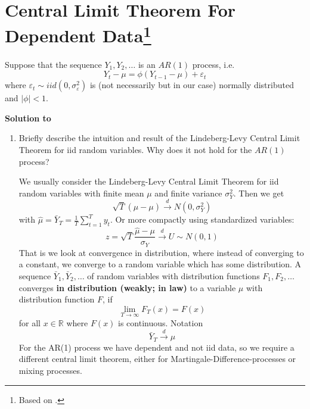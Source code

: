 \documentclass[a4paper]{scrartcl}
\begin{document}
\section[Central Limit Theorem For Dependent Data]{Central Limit Theorem For Dependent Data\footnote{Based on \citet{CrackLedoit.2010}.}}\label{ex:CLTDep}
Suppose that the sequence $Y_{1},Y_{2},\ldots $ is an $AR(1)$ process, i.e.
$$Y_{t}-\mu =\phi \left(Y_{t-1}-\mu\right) +\varepsilon _{t}$$ where $\varepsilon _{t}\sim iid(0,\sigma _{\varepsilon }^{2})$ is (not necessarily but in our case) normally distributed and $|\phi |<1$.
\begin{solution}\textbf{Solution to }\end{solution}
\begin{enumerate}
	\item Briefly describe the intuition and result of the Lindeberg-Levy Central Limit Theorem for iid random variables. Why does it not hold for the $AR(1)$ process?
	\begin{solution}
		We usually consider the Lindeberg-Levy Central Limit Theorem for iid random variables with finite mean $\mu$ and finite variance $\sigma_Y^2$. Then we get $$\sqrt{T} (\hat{\mu}-\mu) \overset{d}{\rightarrow} N(0,\sigma_Y^2)$$ with $\hat{\mu} = \bar{Y}_T = \frac{1}{T} \sum_{t=1}^T y_t$. Or more compactly using standardized variables: $$z = \sqrt{T}\frac{\hat{\mu}-\mu}{\sigma_Y}\overset{d}{\rightarrow} U \sim N(0,1)$$
		That is we look at convergence in distribution, where instead of converging to a constant, we converge to a random variable which has some distribution. A sequence $\bar{Y}_{1},\bar{Y}_{2},\ldots $ of random variables with distribution functions $F_{1},F_{2},\ldots $ converges \textbf{in distribution (weakly; in law)} to a variable $\mu$ with distribution function $F$, if
		\begin{equation*}
		\lim_{T\rightarrow \infty }F_{T}(x)=F(x)
		\end{equation*}
		for all $x\in \mathbb{R}$ where $F(x)$ is continuous. Notation
		\begin{equation*}
		\bar{Y}_{T}\overset{d}{\rightarrow }\mu
		\end{equation*}			
		For the AR(1) process we have dependent and not iid data, so we require a different central limit theorem, either for Martingale-Difference-processes or mixing processes.
		

\end{solution}
\end{enumerate}
\end{document}
